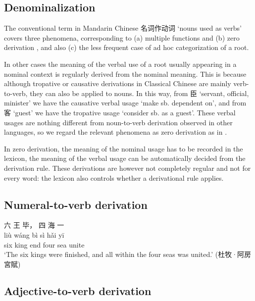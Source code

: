 \documentclass[UTF8, a4paper, oneside, scheme=plain, 12pt]{ctexrep}
\newcommand*{\citesec}[1]{\S~{#1}}
\newcommand{\translate}[1]{`#1'}
\begin{document}
\subsection{Denominalization}\label{sec:pos.verb.noun-to-verb}

The conventional term in Mandarin Chinese 名词作动词 \translate{nouns used as verbs} covers three phenomena,
corresponding to (a) multiple functions and (b) zero derivation \citep[\citesec{11.3}]{dixon2010basic2},
and also (c) the less frequent case of ad hoc categorization of a root.

In other cases the meaning of the verbal use of a root usually appearing in a nominal context
is regularly derived from the nominal meaning.
This is because although tropative or causative derivations in Classical Chinese
are mainly verb-to-verb,
they can also be applied to nouns.
In this way, from 臣 \translate{servant, official, minister}
we have the causative verbal usage \translate{make sb. dependent on},
and from 客 \translate{guest} we have the tropative usage \translate{consider sb. as a guest}.
These verbal usages are nothing different from noun-to-verb derivation observed in other languages,
so we regard the relevant phenomena as zero derivation as in \citet[\citesec{11.3}]{dixon2010basic2}.

In zero derivation, the meaning of the nominal usage has to be recorded in the lexicon,
the meaning of the verbal usage can be automatically decided from the derivation rule.
These derivations are however not completely regular and not for every word:
the lexicon also controls whether a derivational rule applies.


\subsection{Numeral-to-verb derivation}

\begin{exe}
    \ex
    \glll 六 王 毕， 四 海 一 \\
    liù wáng bì sì hǎi yī \\
    six king end four sea unite \\
    \glt\translate{The six kings were finished, and all within the four seas was united.} \hfill (杜牧·阿房宮賦)
\end{exe}

\subsection{Adjective-to-verb derivation}
\end{document}
